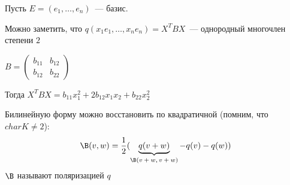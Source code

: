 Пусть $E = (e_1, \dots, e_n)$~--- базис.

Можно заметить, что $q(x_1e_1, \dots, x_ne_n) = X^T B X$~--- однородный многочлен степени $2$

$B = \left(\begin{array}{cc}
b_11 & b_12 \\ 
b_12 & b_22
\end{array}\right)$

Тогда $X^TBX = b_{11}x^2_1 + 2b_{12}x_1x_2 + b_{22}x^2_2$

Билинейную форму можно восстановить по квадратичной (помним, что $char K \neq 2$):
$$
    \B(v, w) = \frac{1}{2}(
        \underbrace{q(v + w)}_{\text{$\B(v + w, v + w)$}} - q(v) - q(w)
        )
$$
$\B$ называют поляризацией $q$